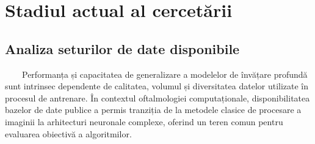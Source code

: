 \documentclass[12pt, a4paper, oneside, romanian]{teza-upb}
\begin{document}
\chapter{Stadiul actual al cercetării}

\section{Analiza seturilor de date disponibile}

\ \ \ \ Performanța și capacitatea de generalizare a modelelor de învățare profundă sunt intrinsec
dependente de calitatea, volumul și diversitatea datelor utilizate în procesul de antrenare. În contextul
oftalmologiei computaționale, disponibilitatea bazelor de date publice a permis tranziția de la metodele
clasice de procesare a imaginii la arhitecturi neuronale complexe, oferind un teren comun pentru
evaluarea obiectivă a algoritmilor.
\end{document}
